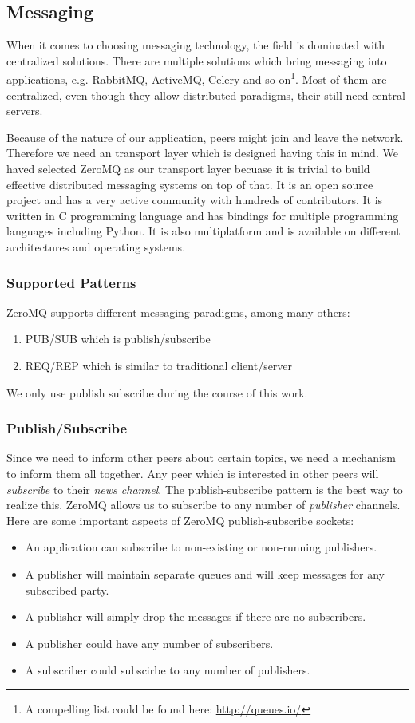 \subsection{Messaging}
When it comes to choosing messaging technology, the field is dominated with centralized solutions.
There are multiple solutions which bring messaging into applications, 
e.g. RabbitMQ, ActiveMQ, Celery and so on\footnote{A compelling list could be found here: \url{http://queues.io/}}.
Most of them are centralized, even though they allow
distributed paradigms, their still need central servers.

Because of the nature of our application, peers might join and leave the network.
Therefore we need an transport layer which is designed having this in mind. 
We haved selected ZeroMQ as our transport layer 
becuase it is trivial to build effective distributed messaging systems on top of that.
It is an open source project and has a very active community with hundreds of contributors. 
It is written in C programming language and has bindings for multiple programming languages including Python.
It is also multiplatform and is available on different architectures and operating systems.

\subsubsection{Supported Patterns}
ZeroMQ supports different messaging paradigms, among many others:
\begin{enumerate}
\item PUB/SUB which is publish/subscribe
\item REQ/REP which is similar to traditional client/server
\end{enumerate}
We only use publish subscribe during the course of this work.

\subsubsection{Publish/Subscribe}
Since we need to inform other peers about certain topics, we need a mechanism to inform them all together.
Any peer which is interested in other peers will \textit{subscribe} to their \textit{news channel}. 
The publish-subscribe pattern is the best way to realize this. 
ZeroMQ allows us to subscribe to any number of \textit{publisher} channels. 
Here are some important aspects of ZeroMQ publish-subscribe sockets:
\begin{itemize}
\item An application can subscribe to non-existing or non-running publishers.
\item A publisher will maintain separate queues and will keep messages for any subscribed party.
\item A publisher will simply drop the messages if there are no subscribers.
\item A publisher could have any number of subscribers.
\item A subscriber could subscirbe to any number of publishers.
\end{itemize}


